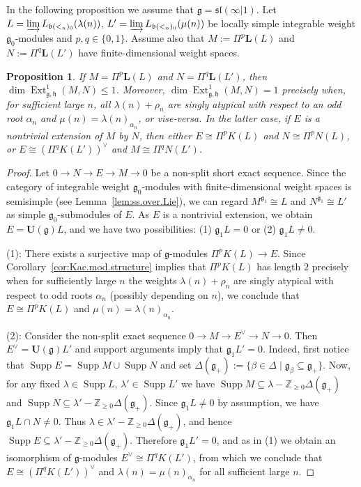 \documentclass[12pt]{amsart}
\newcommand\Z{\mathbb{Z}}
\newcommand\g{\mathfrak{g}}
\newcommand\fh{\mathfrak{h}}
\newcommand\fb{\mathfrak{b}}
\newcommand\fsl{\mathfrak{sl}}
\newcommand\D{\Delta}
\newcommand\bU{\mathbf{U}}
\newcommand\bL{\mathbf{L}}
\DeclareMathOperator{\Ext}{Ext}
\DeclareMathOperator{\Supp}{Supp} %
\theoremstyle{plain}
\newtheorem{prop}[theo]{Proposition}
\theoremstyle{definition}
\numberwithin{equation}{section}
\begin{document}
In the following proposition we assume that $\g=\fsl(\infty|1)$. Let $L = \varinjlim L_{\fb(<_n)_0}(\lambda(n))$, $L' = \varinjlim L_{\fb(<_n)_0}(\mu(n))$ be locally simple integrable weight $\g_0$-modules and $p,q\in \{0,1\}$. Assume also that $M := \Pi^p\bL(L)$ and $N := \Pi^q \bL(L')$ have finite-dimensional weight spaces.

\begin{prop}\label{prop:non-triv.ex=kac}
If $M = \Pi^p\bL(L)$ and $N = \Pi^q \bL(L')$, then  $\dim \Ext_{\g, \fh}^1(M,N)\leq 1$. Moreover, $\dim \Ext_{\g, \fh}^1(M,N) = 1$ precisely when, for sufficient large $n$, all $\lambda(n)+\rho_n$ are  singly atypical with respect to an odd root $\alpha_n$ and $\mu(n) = \lambda(n)_{\alpha_n}$, or vise-versa. In the latter case, if $E$ is a nontrivial extension of $M$ by $N$, then either $E\cong \Pi^pK(L)$ and $N\cong \Pi^pN(L)$, or $E\cong (\Pi^qK(L'))^\vee$ and $M\cong \Pi^qN(L')$.
\end{prop}
\begin{proof}
Let $0\to N\to E\to M\to 0$ be a non-split short exact sequence. Since the category of integrable weight $\g_0$-modules with finite-dimensional weight spaces is semisimple (see Lemma~\ref{lem:ss.over.Lie}), we can regard $M^{\g_{1}}\cong L$ and $N^{\g_1}\cong L'$ as simple $\g_0$-submodules of $E$.  As $E$ is a nontrivial extension, we obtain $E = \bU(\g)L$, and we have two possibilities: (1) $\g_1 L=0$ or (2) $\g_1 L\neq 0$. 

(1): There exists a surjective map of $\g$-modules $\Pi^pK(L)\to E$.  Since Corollary~\ref{cor:Kac.mod.structure} implies that $\Pi^pK(L)$ has length $2$ precisely when for sufficiently large $n$ the weights $\lambda(n)+\rho_n$ are singly atypical with respect to odd roots $\alpha_n$ (possibly depending on $n$), we conclude that $E\cong \Pi^pK(L)$ and $\mu(n) = \lambda(n)_{\alpha_n}$.

(2): Consider the non-split exact sequence $0\to M\to E^\vee\to N\to 0$.  Then $E^\vee = \bU(\g)L'$ and support arguments imply that $\g_1 L'=0$. Indeed, first notice that $\Supp E = \Supp M\cup \Supp N$ and set $\Delta(\g_+) := \{\beta\in \D\mid \g_\beta\subseteq \g_+\}$. Now, for any fixed $\lambda\in \Supp L$, $\lambda'\in \Supp L'$ we have $\Supp M \subseteq \lambda - \Z_{\geq 0}\Delta(\g_+)$ and $\Supp N \subseteq \lambda' - \Z_{\geq 0}\Delta(\g_+)$. Since $\g_1L\neq 0$ by assumption, we have $\g_1L\cap N\neq 0$. Thus $\lambda \in \lambda' - \Z_{\geq 0}\Delta(\g_+)$, and hence $\Supp E \subseteq \lambda'- \Z_{\geq 0}\Delta(\g_+)$. Therefore $\g_1L'=0$, and as in (1) we obtain an isomorphism of $\g$-modules $E^\vee\cong \Pi^qK(L')$, from which we conclude that $E\cong (\Pi^qK(L'))^\vee$ and $\lambda(n) = \mu(n)_{\alpha_n}$ for all sufficient large $n$.
\end{proof}
\end{document}
